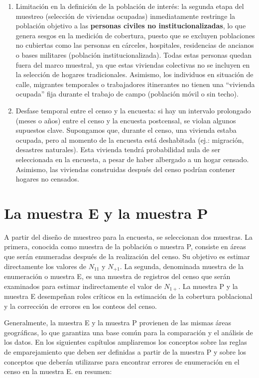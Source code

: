 \documentclass[
  12pt,
]{book}
\begin{document}
\begin{enumerate}
\def\labelenumi{\arabic{enumi}.}
\item
  Limitación en la definición de la población de interés: la segunda etapa del muestreo (selección de viviendas ocupadas) inmediatamente restringe la población objetivo a las \textbf{personas civiles no institucionalizadas}, lo que genera sesgos en la medición de cobertura, puesto que se excluyen poblaciones no cubiertas como las personas en cárceles, hospitales, residencias de ancianos o bases militares (población institucionalizada). Todas estas personas quedan fuera del marco muestral, ya que estas viviendas colectivas no se incluyen en la selección de hogares tradicionales. Asimismo, los individuos en situación de calle, migrantes temporales o trabajadores itinerantes no tienen una ``vivienda ocupada'' fija durante el trabajo de campo (población móvil o sin techo).
\item
  Desfase temporal entre el censo y la encuesta: si hay un intervalo prolongado (meses o años) entre el censo y la encuesta postcensal, se violan algunos supuestos clave. Supongamos que, durante el censo, una vivienda estaba ocupada, pero al momento de la encuesta está deshabitada (ej.: migración, desastres naturales). Esta vivienda tendrá probabilidad nula de ser seleccionada en la encuesta, a pesar de haber albergado a un hogar censado. Asimismo, las viviendas construidas después del censo podrían contener hogares no censados.
\end{enumerate}

\section{La muestra E y la muestra P}\label{la-muestra-e-y-la-muestra-p}

A partir del diseño de muestreo para la encuesta, se seleccionan dos muestras. La primera, conocida como muestra de la población o muestra P, consiste en áreas que serán enumeradas después de la realización del censo. Su objetivo es estimar directamente los valores de \(N_{11}\) y \(N_{+1}\). La segunda, denominada muestra de la enumeración o muestra E, es una muestra de registros del censo que serán examinados para estimar indirectamente el valor de \(N_{1+}\). La muestra P y la muestra E desempeñan roles críticos en la estimación de la cobertura poblacional y la corrección de errores en los conteos del censo.

Generalmente, la muestra E y la muestra P provienen de las mismas áreas geográficas, lo que garantiza una base común para la comparación y el análisis de los datos. En los siguientes capítulos ampliaremos los conceptos sobre las reglas de emparejamiento que deben ser definidas a partir de la muestra P y sobre los conceptos que deberán utilizarse para encontrar errores de enumeración en el censo en la muestra E. en resumen:
\end{document}
